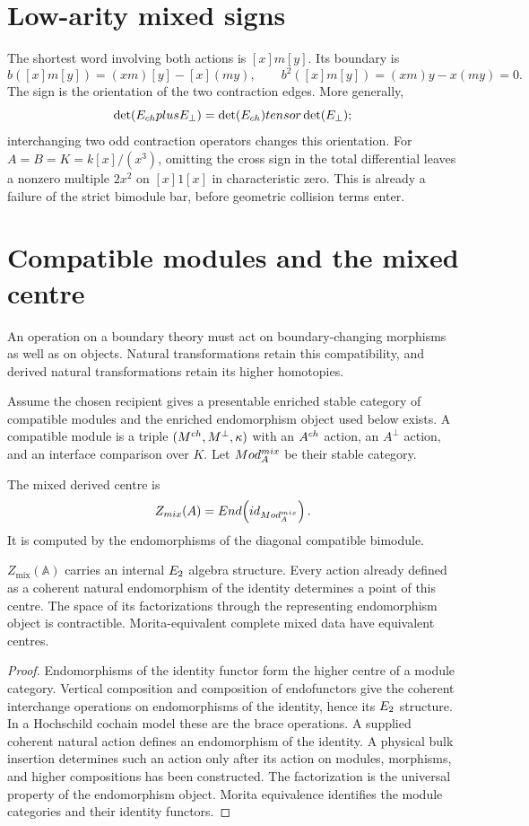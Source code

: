\section{Low-arity mixed signs}
The shortest word involving both actions is $[x]m[y]$. Its boundary is
\[
 b([x]m[y])=(xm)[y]-[x](my),\qquad
 b^2([x]m[y])=(xm)y-x(my)=0.
\]
The sign is the orientation of the two contraction edges. More generally,
\[
 \det(E_{ch}plus E_\perp)
 =\det(E_{ch})tensor\det(E_\perp);
\]
interchanging two odd contraction operators changes this orientation.
For $A=B=K=k[x]/(x^3)$, omitting the cross sign in the total differential
leaves a nonzero multiple $2x^2$ on $[x]1[x]$ in characteristic zero.
This is already a failure of the strict bimodule bar, before geometric
collision terms enter.

\section{Compatible modules and the mixed centre}
An operation on a boundary theory must act on boundary-changing morphisms as well as on objects. Natural transformations retain this compatibility, and derived natural transformations retain its higher homotopies.

Assume the chosen recipient gives a presentable enriched stable category
of compatible modules and the enriched endomorphism object used below exists.
A compatible module is a triple $(M^{ch},M^\perp,\kappa)$ with an $A^{ch}$ action, an $A^\perp$ action, and an interface comparison over $K$.  Let $Mod_{A}^{mix}$ be their stable category.

\begin{definition}
The mixed derived centre is
\[
 Z_{mix}(A)
 =End\!\left(id_{Mod_{A}^{mix}}\right).
\]
It is computed by the endomorphisms of the diagonal compatible bimodule.
\end{definition}

\begin{theorem}
$Z_{\mathrm{mix}}(\mathbb A)$ carries an internal $E_2$ algebra structure.  Every action already defined as a coherent natural endomorphism of the identity determines a point of this centre. The space of its factorizations through the representing endomorphism object is contractible.  Morita-equivalent complete mixed data have equivalent centres.
\end{theorem}
\begin{proof}
Endomorphisms of the identity functor form the higher centre of a module category.  Vertical composition and composition of endofunctors give the coherent
interchange operations on endomorphisms of the identity, hence its $E_2$
structure. In a Hochschild cochain model these are the brace operations.  A supplied coherent natural action defines an endomorphism of the identity. A physical bulk insertion determines such an action only after its action on modules, morphisms, and higher compositions has been constructed.  The factorization is the universal property of the endomorphism object.  Morita equivalence identifies the module categories and their identity functors.
\end{proof}

